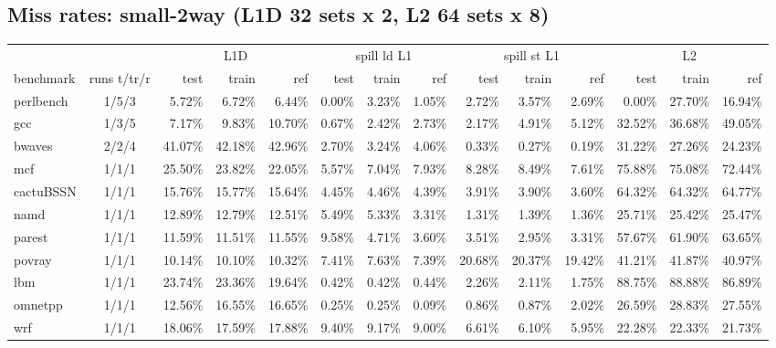 \documentclass[10pt,a4paper,landscape]{article}
\begin{document}
\subsection*{Miss rates: small-2way (L1D 32 sets x 2, L2 64 sets x 8)}
{\footnotesize
\begin{longtable}{lcrrrrrrrrrrrr}
\toprule
& & \multicolumn{3}{c}{L1D} & \multicolumn{3}{c}{spill ld L1} & \multicolumn{3}{c}{spill st L1} & \multicolumn{3}{c}{L2} \\
\cmidrule(lr){3-5}\cmidrule(lr){6-8}\cmidrule(lr){9-11}\cmidrule(lr){12-14}
benchmark & runs t/tr/r & test & train & ref & test & train & ref & test & train & ref & test & train & ref \\
\midrule
\endhead
\bottomrule
\endfoot
perlbench & 1/5/3 & 5.72\% & 6.72\% & 6.44\% & 0.00\% & 3.23\% & 1.05\% & 2.72\% & 3.57\% & 2.69\% & 0.00\% & 27.70\% & 16.94\% \\
gcc & 1/3/5 & 7.17\% & 9.83\% & 10.70\% & 0.67\% & 2.42\% & 2.73\% & 2.17\% & 4.91\% & 5.12\% & 32.52\% & 36.68\% & 49.05\% \\
bwaves & 2/2/4 & 41.07\% & 42.18\% & 42.96\% & 2.70\% & 3.24\% & 4.06\% & 0.33\% & 0.27\% & 0.19\% & 31.22\% & 27.26\% & 24.23\% \\
mcf & 1/1/1 & 25.50\% & 23.82\% & 22.05\% & 5.57\% & 7.04\% & 7.93\% & 8.28\% & 8.49\% & 7.61\% & 75.88\% & 75.08\% & 72.44\% \\
cactuBSSN & 1/1/1 & 15.76\% & 15.77\% & 15.64\% & 4.45\% & 4.46\% & 4.39\% & 3.91\% & 3.90\% & 3.60\% & 64.32\% & 64.32\% & 64.77\% \\
namd & 1/1/1 & 12.89\% & 12.79\% & 12.51\% & 5.49\% & 5.33\% & 3.31\% & 1.31\% & 1.39\% & 1.36\% & 25.71\% & 25.42\% & 25.47\% \\
parest & 1/1/1 & 11.59\% & 11.51\% & 11.55\% & 9.58\% & 4.71\% & 3.60\% & 3.51\% & 2.95\% & 3.31\% & 57.67\% & 61.90\% & 63.65\% \\
povray & 1/1/1 & 10.14\% & 10.10\% & 10.32\% & 7.41\% & 7.63\% & 7.39\% & 20.68\% & 20.37\% & 19.42\% & 41.21\% & 41.87\% & 40.97\% \\
lbm & 1/1/1 & 23.74\% & 23.36\% & 19.64\% & 0.42\% & 0.42\% & 0.44\% & 2.26\% & 2.11\% & 1.75\% & 88.75\% & 88.88\% & 86.89\% \\
omnetpp & 1/1/1 & 12.56\% & 16.55\% & 16.65\% & 0.25\% & 0.25\% & 0.09\% & 0.86\% & 0.87\% & 2.02\% & 26.59\% & 28.83\% & 27.55\% \\
wrf & 1/1/1 & 18.06\% & 17.59\% & 17.88\% & 9.40\% & 9.17\% & 9.00\% & 6.61\% & 6.10\% & 5.95\% & 22.28\% & 22.33\% & 21.73\% \\

\end{longtable}}
\end{document}

